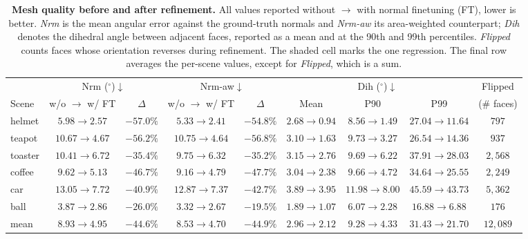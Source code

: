 \begin{table}[t]
\centering
\small
\setlength{\tabcolsep}{3pt}
\caption{\textbf{Mesh quality before and after refinement.}
All values reported without $\rightarrow$ with normal finetuning (FT), lower is
better. \emph{Nrm} is the mean angular error against the ground-truth normals and
\emph{Nrm-aw} its area-weighted counterpart; \emph{Dih} denotes the dihedral
angle between adjacent faces, reported as a mean and at the 90th and 99th
percentiles. \emph{Flipped} counts faces whose orientation reverses during
refinement. The shaded cell marks the one regression. The final row averages the
per-scene values, except for \emph{Flipped}, which is a sum.}
\label{tab:mesh_internal}

\begin{tabular}{l cc cc ccc c}
\toprule
& \multicolumn{2}{c}{Nrm ($^\circ$)$\downarrow$}
& \multicolumn{2}{c}{Nrm-aw$\downarrow$}
& \multicolumn{3}{c}{Dih ($^\circ$)$\downarrow$}
& Flipped \\
\cmidrule(lr){2-3} \cmidrule(lr){4-5} \cmidrule(lr){6-8} \cmidrule(lr){9-9}
Scene
& w/o $\rightarrow$ w/ FT & $\Delta$
& w/o $\rightarrow$ w/ FT & $\Delta$
& Mean & P90 & P99
& (\# faces) \\
\midrule
helmet  & $5.98 \rightarrow 2.57$   & $-57.0\%$ & $5.33 \rightarrow 2.41$   & $-54.8\%$ & $2.68 \rightarrow 0.94$ & $8.56 \rightarrow 1.49$  & $27.04 \rightarrow 11.64$ & $797$ \\
teapot  & $10.67 \rightarrow 4.67$  & $-56.2\%$ & $10.75 \rightarrow 4.64$  & $-56.8\%$ & $3.10 \rightarrow 1.63$ & $9.73 \rightarrow 3.27$  & $26.54 \rightarrow 14.36$ & $937$ \\
toaster & $10.41 \rightarrow 6.72$  & $-35.4\%$ & $9.75 \rightarrow 6.32$   & $-35.2\%$ & $3.15 \rightarrow 2.76$ & $9.69 \rightarrow 6.22$  & $37.91 \rightarrow 28.03$ & $2{,}568$ \\
coffee  & $9.62 \rightarrow 5.13$   & $-46.7\%$ & $9.16 \rightarrow 4.79$   & $-47.7\%$ & $3.04 \rightarrow 2.38$ & $9.66 \rightarrow 4.72$  & $34.64 \rightarrow 25.55$ & $2{,}249$ \\
car     & $13.05 \rightarrow 7.72$  & $-40.9\%$ & $12.87 \rightarrow 7.37$  & $-42.7\%$ & \cellcolor{red!15} $3.89 \rightarrow 3.95$ & $11.98 \rightarrow 8.00$ & $45.59 \rightarrow 43.73$ & $5{,}362$ \\
ball    & $3.87 \rightarrow 2.86$   & $-26.0\%$ & $3.32 \rightarrow 2.67$   & $-19.5\%$ & $1.89 \rightarrow 1.07$ & $6.07 \rightarrow 2.28$  & $16.88 \rightarrow 6.88$  & $176$ \\
\midrule
mean    & $8.93 \rightarrow 4.95$   & $-44.6\%$ & $8.53 \rightarrow 4.70$   & $-44.9\%$ & $2.96 \rightarrow 2.12$ & $9.28 \rightarrow 4.33$  & $31.43 \rightarrow 21.70$ & $12{,}089$ \\
\bottomrule
\end{tabular}
\end{table}
